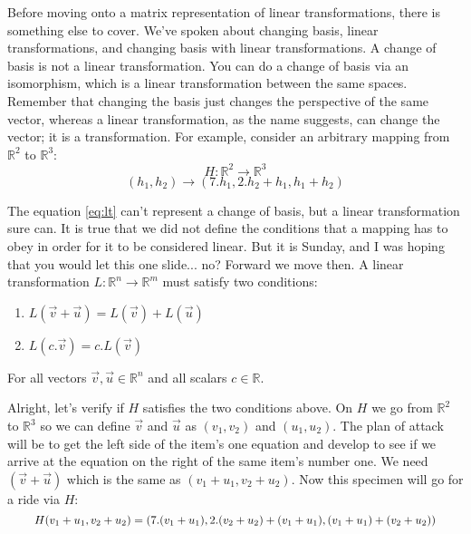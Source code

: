 \documentclass[a4,12pt,twosided,openany]{memoir}
\begin{document}
Before moving onto a matrix representation of linear transformations, there is something else to cover. We’ve spoken about changing basis, linear transformations, and changing basis with linear transformations. A change of basis is not a linear transformation. You can do a change of basis via an isomorphism, which is a linear transformation between the same spaces. Remember that changing the basis just changes the perspective of the same vector, whereas a linear transformation, as the name suggests, can change the vector; it is a transformation. For example, consider an arbitrary  mapping from $\mathbb{R}^2$ to $\mathbb{R}^3$:
\begin{equation} \label{eq:lt}
H:\mathbb{R}^2 \rightarrow \mathbb{R}^3
\end{equation}
\[(h_1,h_2) \rightarrow (7.h_1, 2.h_2 + h_1, h_1+h_2) \]
\par 
\indent
The equation \ref{eq:lt} can’t represent a change of basis, but a linear transformation sure can. It is true that we did not define the conditions that a mapping has to obey in order for it to be considered linear. But it is Sunday, and I was hoping
that you would let this one slide... no? Forward we move then. A linear transformation $L:\mathbb{R}^n \rightarrow \mathbb{R}^m$ must satisfy two conditions:
\begin{tcolorbox}
\begin{enumerate}
\item $L(\overrightarrow{v} + \overrightarrow{u}) = L(\overrightarrow{v}) + L(\overrightarrow{u})$
\item $L(c.\overrightarrow{v}) = c.L(\overrightarrow{v})$
\end{enumerate}
\end{tcolorbox}
For all vectors $\overrightarrow{v},\overrightarrow{u} \in \mathbb{R}^n$ and all scalars $c \in \mathbb{R}$.
\par 
\indent
Alright, let's verify if $H$ satisfies the two conditions above. On $H$ we go from $\mathbb{R}^2$ to $\mathbb{R}^3$ so we can define $\overrightarrow{v}$ and $\overrightarrow{u}$ as $(v_1, v_2)$ and $(u_1, u_2)$. The plan of attack will be to get the left side of the item's one equation and develop to see if we arrive at the equation on the right of the same item's number one. We need $(\overrightarrow{v} + \overrightarrow{u})$ which is the same as $(v_1 + u_1, v_2 + u_2)$. Now this specimen will go for a ride via $H$:
\[ \scalebox{.9}{$\displaystyle H(v_1 + u_1, v_2 + u_2) = (7.(v_1 + u_1), 2.(v_2 + u_2) + (v_1 + u_1), (v_1 + u_1) + (v_2 + u_2) ) $} \]
\end{document}
